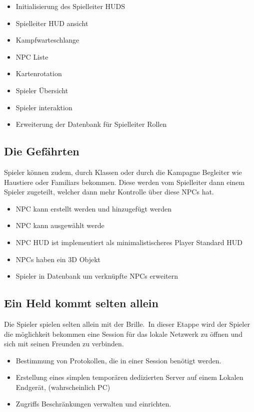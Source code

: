 \begin{itemize}
    \item Initialisierung des Spielleiter HUDS
    \item Spielleiter HUD ansicht
    \item Kampfwarteschlange
    \item NPC Liste
    \item Kartenrotation
    \item Spieler Übersicht
    \item Spieler interaktion
    \item Erweiterung der Datenbank für Spielleiter Rollen
\end{itemize}

\subsection{Die Gefährten}\label{subsec:npcs}
Spieler können zudem, durch Klassen oder durch die Kampagne Begleiter wie Haustiere oder Familiars bekommen.
Diese werden vom Spielleiter dann einem Spieler zugeteilt, welcher dann mehr Kontrolle über diese NPCs hat.
\begin{itemize}
    \item NPC kann erstellt werden und hinzugefügt werden
    \item NPC kann ausgewählt werde
    \item NPC HUD ist implementiert als minimalistischeres Player Standard HUD
    \item NPCs haben ein 3D Objekt
    \item Spieler in Datenbank um verknüpfte NPCs erweitern
\end{itemize}

\subsection{Ein Held kommt selten allein}\label{subsec:connecting_friends}
Die Spieler spielen selten allein mit der Brille.\ In dieser Etappe wird der Spieler die möglichkeit bekommen eine
Session für das lokale Netzwerk zu öffnen und sich mit seinen Freunden zu verbinden.

\begin{itemize}
    \item Bestimmung von Protokollen, die in einer Session benötigt werden.
    \item Erstellung eines simplen temporären dedizierten Server auf einem Lokalen Endgerät, (wahrscheinlich PC)
    \item Zugriffs Beschränkungen verwalten und einrichten.
\end{itemize}

